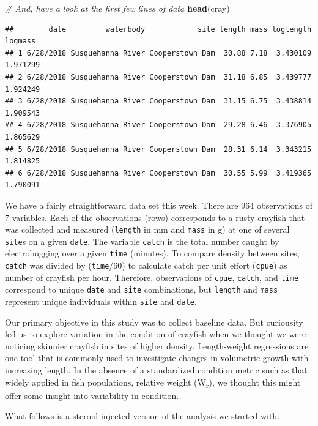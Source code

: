 \documentclass[
]{book}
\newenvironment{Shaded}{\begin{snugshade}}{\end{snugshade}}
\newcommand{\CommentTok}[1]{\textcolor[rgb]{0.56,0.35,0.01}{\textit{#1}}}
\newcommand{\KeywordTok}[1]{\textcolor[rgb]{0.13,0.29,0.53}{\textbf{#1}}}
\newcommand{\NormalTok}[1]{#1}
\begin{document}
\begin{Shaded}
\begin{Highlighting}[]
\CommentTok{# And, have a look at the first few lines of data}
\KeywordTok{head}\NormalTok{(cray)}
\end{Highlighting}
\end{Shaded}

\begin{verbatim}
##        date         waterbody            site length mass loglength  logmass
## 1 6/28/2018 Susquehanna River Cooperstown Dam  30.88 7.18  3.430109 1.971299
## 2 6/28/2018 Susquehanna River Cooperstown Dam  31.18 6.85  3.439777 1.924249
## 3 6/28/2018 Susquehanna River Cooperstown Dam  31.15 6.75  3.438814 1.909543
## 4 6/28/2018 Susquehanna River Cooperstown Dam  29.28 6.46  3.376905 1.865629
## 5 6/28/2018 Susquehanna River Cooperstown Dam  28.31 6.14  3.343215 1.814825
## 6 6/28/2018 Susquehanna River Cooperstown Dam  30.55 5.99  3.419365 1.790091
\end{verbatim}

We have a fairly straightforward data set this week. There are 964 observations of 7 variables. Each of the observations (rows) corresponds to a rusty crayfish that was collected and measured (\texttt{length} in mm and \texttt{mass} in g) at one of several \texttt{site}s on a given \texttt{date}. The variable \texttt{catch} is the total number caught by electrobugging over a given \texttt{time} (minutes). To compare density between sites, \texttt{catch} was divided by (\texttt{time}/60) to calculate catch per unit effort (\texttt{cpue}) as number of crayfish per hour. Therefore, observations of \texttt{cpue}, \texttt{catch}, and \texttt{time} correspond to unique \texttt{date} and \texttt{site} combinations, but \texttt{length} and \texttt{mass} represent unique individuals within \texttt{site} and \texttt{date}.

Our primary objective in this study was to collect baseline data. But curiousity led us to explore variation in the condition of crayfish when we thought we were noticing skinnier crayfish in sites of higher density. Length-weight regressions are one tool that is commonly used to investigate changes in volumetric growth with increasing length. In the absence of a standardized condition metric such as that widely applied in fish populations, relative weight (W\textsubscript{r}), we thought this might offer some insight into variability in condition.

What follows is a steroid-injected version of the analysis we started with.
\end{document}
